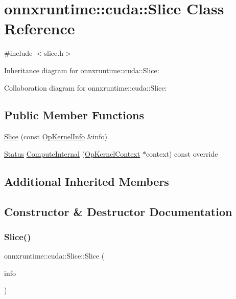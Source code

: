 \hypertarget{classonnxruntime_1_1cuda_1_1Slice}{}\section{onnxruntime\+:\+:cuda\+:\+:Slice Class Reference}
\label{classonnxruntime_1_1cuda_1_1Slice}


{\ttfamily \#include $<$slice.\+h$>$}



Inheritance diagram for onnxruntime\+:\+:cuda\+:\+:Slice\+:


Collaboration diagram for onnxruntime\+:\+:cuda\+:\+:Slice\+:
\subsection*{Public Member Functions}
\begin{DoxyCompactItemize}
\item 
\mbox{\hyperlink{classonnxruntime_1_1cuda_1_1Slice_a4a7df08c95d169b7974318f582b70ec2}{Slice}} (const \mbox{\hyperlink{classonnxruntime_1_1OpKernelInfo}{Op\+Kernel\+Info}} \&info)
\item 
\mbox{\hyperlink{classonnxruntime_1_1common_1_1Status}{Status}} \mbox{\hyperlink{classonnxruntime_1_1cuda_1_1Slice_a2726a33736da2c094d5f7eec39f86abc}{Compute\+Internal}} (\mbox{\hyperlink{classonnxruntime_1_1OpKernelContext}{Op\+Kernel\+Context}} $\ast$context) const override
\end{DoxyCompactItemize}
\subsection*{Additional Inherited Members}


\subsection{Constructor \& Destructor Documentation}
\mbox{\label{classonnxruntime_1_1cuda_1_1Slice_a4a7df08c95d169b7974318f582b70ec2}} 
\subsubsection{\texorpdfstring{Slice()}{Slice()}}
{\footnotesize\ttfamily onnxruntime\+::cuda\+::\+Slice\+::\+Slice (\begin{DoxyParamCaption}\item[{const \mbox{\hyperlink{classonnxruntime_1_1OpKernelInfo}{Op\+Kernel\+Info}} \&}]{info }\end{DoxyParamCaption})\hspace{0.3cm}{\ttfamily [inline]}}



